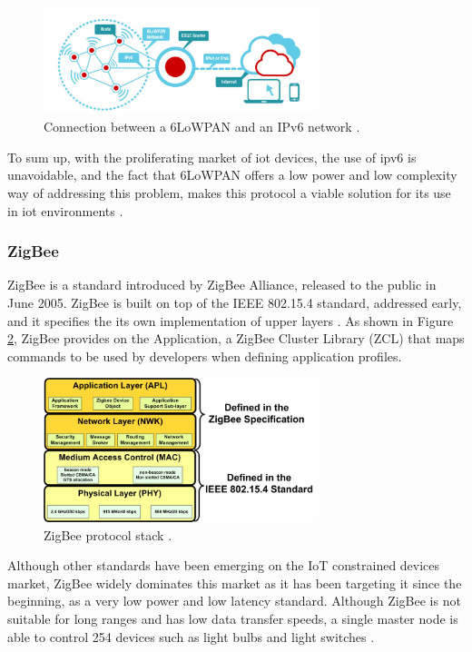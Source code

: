 \begin{figure}[H]
	\centering
	\includegraphics[width=0.7\textwidth]{figures/edge.png}
	\caption{Connection between a 6LoWPAN and an IPv6 network \cite{6low}.}
	\label{fig:6low}
\end{figure}


To sum up, with the proliferating market of \ac{iot} devices, the use of \ac{ipv6} is unavoidable, and the fact that 6LoWPAN offers a low power and low complexity way of addressing this problem, makes this protocol a viable solution for its use in \ac{iot} environments \cite{Mehboob2016}.  


\subsubsection{ZigBee}
ZigBee is a standard introduced by ZigBee Alliance, released to the public in June 2005. ZigBee is built on top of the IEEE 802.15.4 standard, addressed early, and it specifies the its own implementation of upper layers \cite{INSTEON2013}. As shown in Figure \ref{fig:zig}, ZigBee provides on the Application, a ZigBee Cluster Library (ZCL) that maps commands to be used by developers when defining application profiles.


\begin{figure}[H]
	\centering
	\includegraphics[width=0.7\textwidth]{figures/zig.jpg}
	\caption{ZigBee protocol stack \cite{article}.}
	\label{fig:zig}
\end{figure}


Although other standards have been emerging on the IoT constrained devices market, ZigBee widely dominates this market as it has been targeting it since the beginning, as a very low power and low latency standard.
Although ZigBee is not suitable for long ranges and has low data transfer speeds, a single master node is able to control 254 devices such as light bulbs and light switches \cite{Mehboob2016}. 

